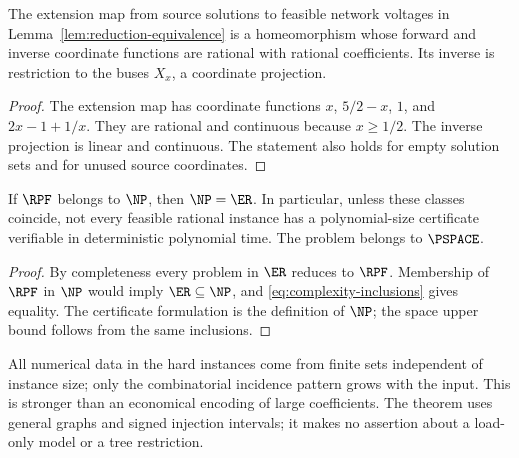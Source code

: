 \begin{proposition}
\label{prop:rational-bijection}
The extension map from source solutions to feasible network voltages in
Lemma~\ref{lem:reduction-equivalence} is a homeomorphism whose forward and
inverse coordinate functions are rational with rational coefficients.
Its inverse is restriction to the buses $X_x$, a coordinate projection.
\end{proposition}
\begin{proof}
The extension map has coordinate functions $x$, $5/2-x$, $1$, and
$2x-1+1/x$. They are rational and continuous because $x\ge1/2$.
The inverse projection is linear and continuous. The statement also holds
for empty solution sets and for unused source coordinates.
\end{proof}

\begin{corollary}
\label{cor:rpf-np}
If $\RPF$ belongs to $\NP$, then $\NP=\ER$. In particular, unless these
classes coincide, not every feasible rational instance has a polynomial-size
certificate verifiable in deterministic polynomial time. The problem belongs
to $\PSPACE$.
\end{corollary}
\begin{proof}
By completeness every problem in $\ER$ reduces to $\RPF$. Membership of
$\RPF$ in $\NP$ would imply $\ER\subseteq\NP$, and
\eqref{eq:complexity-inclusions} gives equality. The certificate formulation
is the definition of $\NP$; the space upper bound follows from the same
inclusions.
\end{proof}

All numerical data in the hard instances come from finite sets independent
of instance size; only the combinatorial incidence pattern grows with the
input. This is stronger than an economical encoding of large coefficients.
The theorem uses general graphs and signed injection intervals; it makes no
assertion about a load-only model or a tree restriction.
